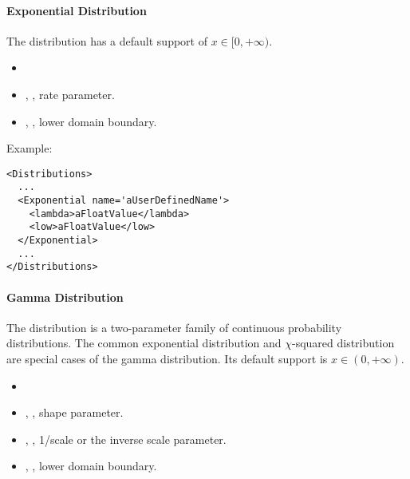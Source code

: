 \paragraph{Exponential Distribution}
\label{Exponential}
The  distribution has a default support of
$x \in [0, +\infty)$.

%
\attrIntro
\vspace{-5mm}
\begin{itemize}
  \itemsep0em
  \item \nameDescription
\end{itemize}
\vspace{-5mm}
\subnodeIntro
\begin{itemize}
  \item {}, , rate parameter.
  \item {}, , lower domain
     boundary. 
\end{itemize}

Example:
\begin{lstlisting}[style=XML]
<Distributions>
  ...
  <Exponential name='aUserDefinedName'>
    <lambda>aFloatValue</lambda>
    <low>aFloatValue</low>
  </Exponential>
  ...
</Distributions>
\end{lstlisting}

\paragraph{Gamma Distribution}
\label{Gamma}
The  distribution is a two-parameter family of continuous
probability distributions.
%
The common exponential distribution and $\chi$-squared distribution are special
cases of the gamma distribution.
%
Its default support is $x \in (0,+\infty)$.

%
\attrIntro
\vspace{-5mm}
\begin{itemize}
  \itemsep0em
  \item \nameDescription
\end{itemize}
\vspace{-5mm}
\subnodesIntro
\begin{itemize}
  \item {}, , shape parameter.
  \item {}, , 1/scale or the
  inverse scale parameter. 
  \item {}, , lower domain
  boundary. 
\end{itemize}

